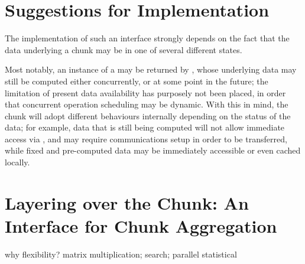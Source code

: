 \documentclass[10pt, a4paper]{article}
\begin{document}
\section{Suggestions for Implementation}

The implementation of such an interface strongly depends on the fact that the data underlying a chunk may be in one of several different states. 

Most notably, an instance of a  may be returned by , whose underlying data may still be computed either concurrently, or at some point in the future; the limitation of present data availability has purposely not been placed, in order that concurrent operation scheduling may be dynamic.
With this in mind, the chunk will adopt different behaviours internally depending on the status of the data; for example, data that is still being computed will not allow immediate access via , and may require communications setup in order to be transferred, while fixed and pre-computed data may be immediately accessible or even cached locally.


\section{Layering over the Chunk: An Interface for Chunk Aggregation}
\cite{guo2012parallel}
why flexibility?
matrix multiplication; search; parallel statistical

\end{document}
